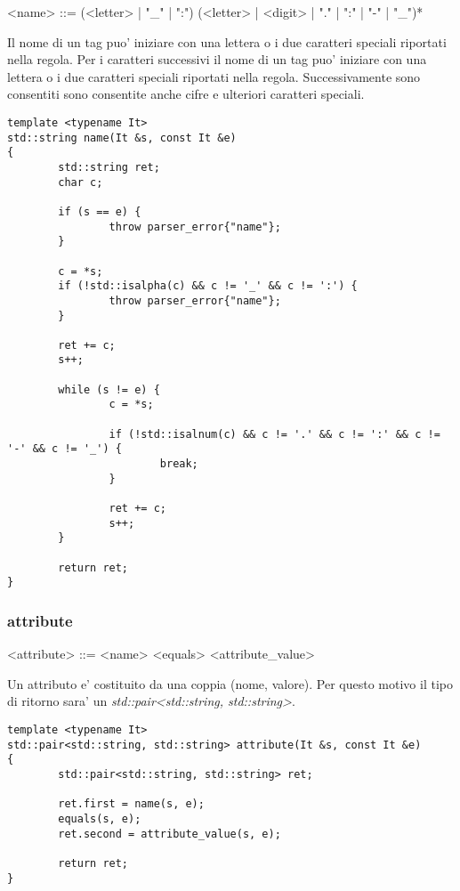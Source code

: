 \documentclass[italian,a4paper]{article}
\begin{document}
\begin{grammar}
	<name> ::= (<letter> | "\_" | ":") (<letter> | <digit> | "." | ":" | "-" | "\_")*
\end{grammar}

Il nome di un tag puo' iniziare con una lettera o i due caratteri speciali
riportati nella regola. Per i caratteri successivi il nome di un tag puo'
iniziare con una lettera o i due caratteri speciali riportati nella regola.
Successivamente sono consentiti sono consentite anche cifre e ulteriori
caratteri speciali.

\begin{verbatim}
template <typename It>
std::string name(It &s, const It &e)
{
        std::string ret;
        char c;

        if (s == e) {
                throw parser_error{"name"};
        }

        c = *s;
        if (!std::isalpha(c) && c != '_' && c != ':') {
                throw parser_error{"name"};
        }

        ret += c;
        s++;

        while (s != e) {
                c = *s;

                if (!std::isalnum(c) && c != '.' && c != ':' && c != '-' && c != '_') {
                        break;
                }

                ret += c;
                s++;
        }

        return ret;
}
\end{verbatim}

\subsubsection{attribute}

\begin{grammar}
	<attribute> ::= <name> <equals> <attribute\_value>
\end{grammar}

Un attributo e' costituito da una coppia (nome, valore). Per questo motivo il
tipo di ritorno sara' un \emph{std::pair<std::string, std::string>}.

\begin{verbatim}
template <typename It>
std::pair<std::string, std::string> attribute(It &s, const It &e)
{
        std::pair<std::string, std::string> ret;

        ret.first = name(s, e);
        equals(s, e);
        ret.second = attribute_value(s, e);

        return ret;
}
\end{verbatim}
\end{document}
